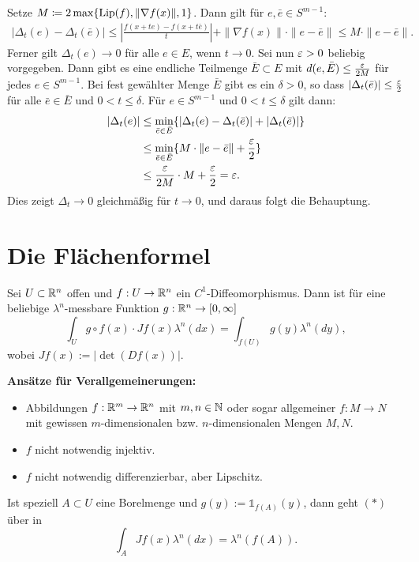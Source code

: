 \documentclass[a4paper,twoside,DIV15,BCOR12mm]{scrbook}
\newcommand{\ind}{\mathds 1}
\DeclareMathOperator{\Lip}{Lip}
\begin{document}
\begin{beweis}
\begin{enumerate}[{Teil} 1:]
Setze $M\da 2\max\{\Lip(f), \|\nabla f(x)\|, 1\}$. Dann gilt für $e,\bar e\in S^{m-1}$:
\begin{align*}
|\Delta_t (e) - \Delta_t(\bar e)|
\le | \frac{f(x + t e) - f(x + t \bar e)}t | + \|\nabla f(x) \| \cdot \|e-\bar e\|
\le M \cdot \|e-\bar e\|.
\end{align*}
Ferner gilt $\Delta_t(e) \to 0$ für alle $e\in E$, wenn $t \to 0$. 
Sei nun $\varepsilon>0$ beliebig vorgegeben. Dann gibt es eine endliche Teilmenge $\bar E\subset E$ mit $d(e,\bar E) \le \frac{\varepsilon}{2M}$ für jedes $e\in S^{m-1}$. Bei fest gewählter Menge $\bar{E}$ gibt es ein $\delta>0$, so dass $|\Delta_{t} (\bar e) | \le \frac{\varepsilon}2$ für alle $\bar e\in\bar E$ und $0<t\le \delta$. Für $e\in S^{m-1}$ und $0<t\le\delta$ gilt dann:
\begin{align*}
|\Delta_{t} (e)|
&\le \min_{\bar e\in\bar E} \{ |\Delta_{t}(e) - \Delta_{t}(\bar e)| + |\Delta_{t}(\bar e)|\} \\
&\le \min_{\bar e\in\bar E} \{ M \cdot \|e-\bar e\| + \frac{\varepsilon}2\} \\
&\le \frac{\varepsilon}{2M} \cdot M + \frac{\varepsilon}2 = \varepsilon.
\end{align*}
Dies zeigt $\Delta_t\to 0$ gleichmäßig für $t\to 0$, und daraus folgt die Behauptung.
\end{enumerate}
\end{beweis}

\section{Die Flächenformel}
Sei $U\subset\mathbb{R}^n$ offen und $f:U\to\mathbb{R}^n$ ein $C^1$-Diffeomorphismus. Dann ist für eine beliebige 
$\lambda^n$-messbare Funktion $g:\mathbb{R}^n\to [0,\infty]$
\begin{equation}
\int_U g\circ f(x)\cdot Jf(x) \lambda^n(dx)=\int_{f(U)}g(y)\lambda^n(dy),\tag{$*$}
\end{equation}
wobei $Jf(x):=|\det(Df(x))|$.

\textbf{Ansätze für Verallgemeinerungen:}
\begin{itemize}
\item Abbildungen $f:\mathbb{R}^m\to\mathbb{R}^n$ mit $m,n\in\mathbb{N}$ oder sogar allgemeiner $f:M\to N$ mit gewissen $m$-dimensionalen bzw. $n$-dimensionalen Mengen $M,N$.
\item $f$ nicht notwendig injektiv.
\item $f$ nicht notwendig differenzierbar, aber Lipschitz.
\end{itemize}

Ist speziell $A\subset U$ eine Borelmenge und $g(y):=\ind_{f(A)}(y)$, dann geht $(*)$ über in
\[
\int_A Jf(x)\lambda^n(dx)=\lambda^n(f(A)).
\]
\end{document}

